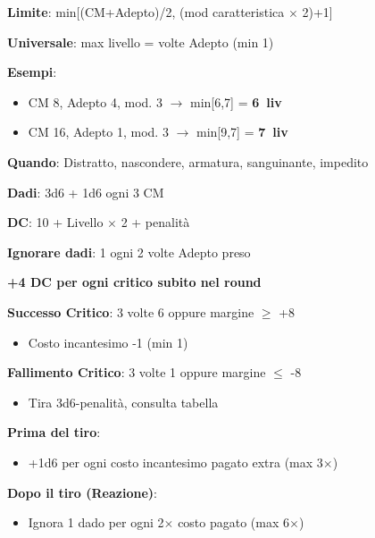 \documentclass[10pt,a4paper,landscape]{article}
\begin{document}
\begin{multicols}{3}
\begin{tcolorbox}[title=MASSIMO LIVELLO INCANTESIMI]
			\textbf{Limite}: min[(CM+Adepto)/2, (mod caratteristica $\times$ 2)+1]
			
			\textbf{Universale}: max livello = volte Adepto (min 1)
			
			\textbf{Esempi}:
			\begin{itemize}[leftmargin=*,noitemsep]
				\item CM 8, Adepto 4, mod. 3 $\rightarrow$ min[6,7] = \textbf{6\textordmasculine\ liv}
				\item CM 16, Adepto 1, mod. 3 $\rightarrow$ min[9,7] = \textbf{7\textordmasculine\ liv}
			\end{itemize}
		\end{tcolorbox}
		
		\begin{tcolorbox}[title=PROVA DI MAGIA,colback=criticalcolor!10!white]
			\textbf{Quando}: Distratto, nascondere, armatura, sanguinante, impedito
			
			\textbf{Dadi}: 3d6 + 1d6 ogni 3 CM
			
			\textbf{DC}: 10 + Livello $\times$ 2 + penalità
			
			\textbf{Ignorare dadi}: 1 ogni 2 volte Adepto preso
			
			\textbf{+4 DC per ogni critico subito nel round}
			
			\textcolor{successcolor}{\textbf{Successo Critico}}: 3 volte 6 oppure margine $\geq$ +8
			\begin{itemize}[leftmargin=*,noitemsep]
				\item Costo incantesimo -1 (min 1)
			\end{itemize}
			
			\textcolor{criticalcolor}{\textbf{Fallimento Critico}}: 3 volte 1 oppure margine $\leq$ -8
			\begin{itemize}[leftmargin=*,noitemsep]
				\item Tira 3d6-penalità, consulta tabella
			\end{itemize}
		\end{tcolorbox}
		
		\begin{tcolorbox}[title=POTENZIARE PROVE MAGIA]
			\textbf{Prima del tiro}:
			\begin{itemize}[leftmargin=*,noitemsep]
				\item +1d6 per ogni costo incantesimo pagato extra (max 3$\times$)
			\end{itemize}
			
			\textbf{Dopo il tiro (Reazione)}:
			\begin{itemize}[leftmargin=*,noitemsep]
				\item Ignora 1 dado per ogni 2$\times$ costo pagato (max 6$\times$)
			\end{itemize}
			

\end{tcolorbox}
\end{multicols}
\end{document}
